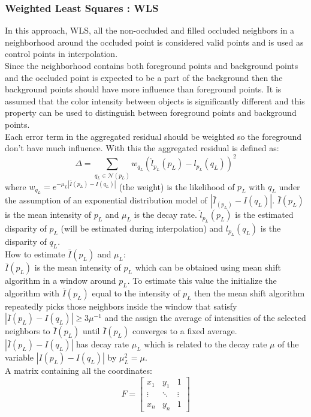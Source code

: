 \subsubsection{Weighted Least Squares : WLS}
In this approach, WLS, all the non-occluded and filled occluded neighbors in a neighborhood around the occluded point is considered valid points and is used as control points in interpolation.\\
Since the neighborhood contains both foreground points and background points and the occluded point is expected to be a part of the background then the background points should have more influence than foreground points. It is assumed that the color intensity between objects is significantly different and this property can be used to distinguish between foreground points and background points. \\
Each error term in the aggregated residual should be weighted so the foreground don't have much influence. With this the aggregated residual is defined as:
\begin{equation}
  \Delta = \sum_{q_L \in \mathcal{N}(p_L)} w_{q_L} (\hat{l}_{p_L}(p_L)-l_{p_L}(q_L))^2
\end{equation}
where $w_{q_L} = e^{-\mu_L | \bar{I}(p_L) - I(q_L)|}$ (the weight) is the likelihood of $p_L$ with $q_L$ under the assumption of an exponential distribution model of $| \bar{I}_(p_L)- I(q_L) |$. $\bar{I}(p_L)$ is the mean intensity of $p_L$ and $\mu_L$ is the decay rate. $\hat{l}_{p_L}(p_L)$ is the estimated disparity of $p_L$ (will be estimated during interpolation) and $l_{p_L}(q_L)$ is the disparity of $q_L$. \\
How to estimate $\bar{I}(p_L)$ and $\mu_L$:\\
$\bar{I}(p_L)$ is the mean intensity of $p_L$ which can be obtained using mean shift algorithm in a window around $p_L$. To estimate this value the initialize the algorithm with $\bar{I}(p_L) $ equal to the intensity of $p_L$ then the mean shift algorithm repeatedly picks those neighbors inside the window that satisfy $| \bar{I}(p_L) - I (q_L) | \geq 3\mu^{-1}$ and the assign the average of intensities of the selected neighbors to $\bar{I}(p_L)$ until $\bar{I}(p_L)$ converges to a fixed average. $|\bar{I}(p_L) - I(q_L)|$ has decay rate $\mu_L$ which is related to the decay rate $\mu$ of the variable $|I(p_L) - I(q_L)|$ by $\mu_L^2 = \mu$.\\
A matrix containing all the coordinates:
\begin{equation}
F = \begin{bmatrix}
  x_1 & y_1 & 1 \\
  \vdots & \ddots & \vdots\\
  x_n & y_n & 1 
\end{bmatrix}
\end{equation}

